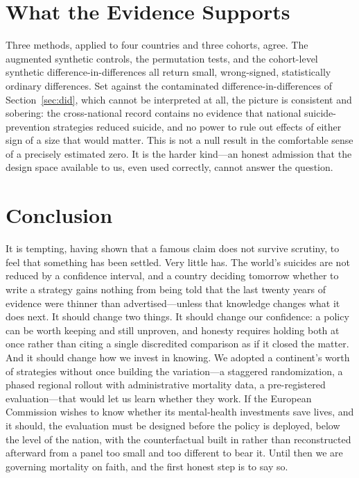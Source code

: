 \documentclass[12pt]{article}
\begin{document}
\section{What the Evidence Supports}

Three methods, applied to four countries and three cohorts, agree. The augmented synthetic controls,
the permutation tests, and the cohort-level synthetic difference-in-differences all return small,
wrong-signed, statistically ordinary differences. Set against the contaminated
difference-in-differences of Section~\ref{sec:did}, which cannot be interpreted at all, the picture
is consistent and sobering: the cross-national record contains no evidence that national
suicide-prevention strategies reduced suicide, and no power to rule out effects of either sign of a
size that would matter. This is not a null result in the comfortable sense of a precisely estimated
zero. It is the harder kind---an honest admission that the design space available to us, even used
correctly, cannot answer the question.

\section{Conclusion}

It is tempting, having shown that a famous claim does not survive scrutiny, to feel that something
has been settled. Very little has. The world's suicides are not reduced by a confidence interval, and
a country deciding tomorrow whether to write a strategy gains nothing from being told that the last
twenty years of evidence were thinner than advertised---unless that knowledge changes what it does
next. It should change two things. It should change our confidence: a policy can be worth keeping and
still unproven, and honesty requires holding both at once rather than citing a single discredited
comparison as if it closed the matter. And it should change how we invest in knowing. We adopted a
continent's worth of strategies without once building the variation---a staggered randomization, a
phased regional rollout with administrative mortality data, a pre-registered evaluation---that would
let us learn whether they work. If the European Commission wishes to know whether its mental-health
investments save lives, and it should, the evaluation must be designed before the policy is deployed,
below the level of the nation, with the counterfactual built in rather than reconstructed afterward
from a panel too small and too different to bear it. Until then we are governing mortality on faith,
and the first honest step is to say so.
\end{document}
